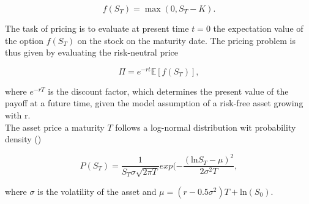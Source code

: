 \documentclass[../main.tex]{subfiles}
\begin{document}
\begin{equation}
    f(S_T) = \max(0, S_T - K ).
\end{equation}

The task of pricing is to evaluate at present time $t = 0$ the expectation value of the option $f(S_T)$ on the stock on the maturity date.
The pricing problem is thus given by evaluating the risk-neutral price

\begin{equation}
    \Pi = e^{-rt} \mathbb{E}[f(S_T)],
\end{equation}

where $e^{-rT}$ is the discount factor, which determines the present value of the payoff at a future time, given the model assumption of a risk-free asset growing with r.\\
The asset price a maturity $T$ follows a log-normal distribution wit probability density (\cite{Stamatopoulos_2019})

\begin{equation}
    P(S_T) = \frac{1}{S_T \sigma \sqrt{2 \pi T}} exp (- \frac{(\text{ln} S_T - \mu)^2}{2 \sigma^2 T}, \label{eq:lognormal}
\end{equation}

where $\sigma$ is the volatility of the asset and $\mu = (r-0.5\sigma^2)T + \text{ln}(S_0)$.

\biblio
\end{document}
